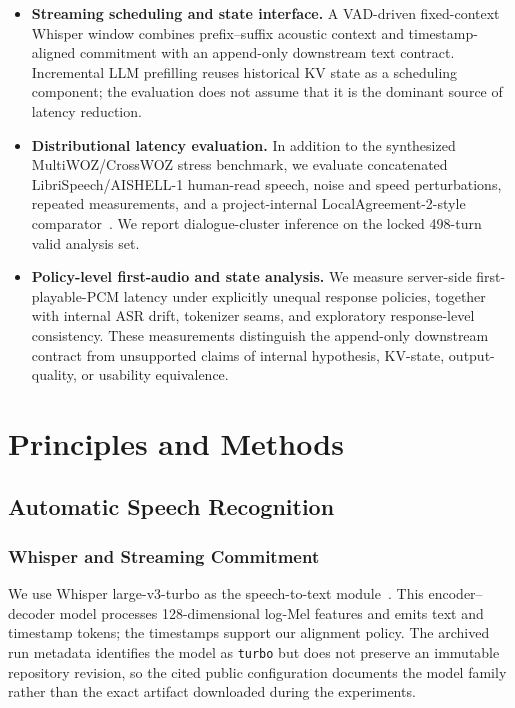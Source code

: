 \documentclass[conference]{IEEEtran}
\begin{document}
\begin{itemize}
\item \textbf{Streaming scheduling and state interface.} A VAD-driven fixed-context Whisper window combines prefix--suffix acoustic context and timestamp-aligned commitment with an append-only downstream text contract. Incremental LLM prefilling reuses historical KV state as a scheduling component; the evaluation does not assume that it is the dominant source of latency reduction.

\item \textbf{Distributional latency evaluation.} In addition to the synthesized MultiWOZ/CrossWOZ stress benchmark, we evaluate concatenated LibriSpeech/AISHELL-1 human-read speech, noise and speed perturbations, repeated measurements, and a project-internal LocalAgreement-2-style comparator~\cite{machacek2023turning,liu2020partialhypothesis}. We report dialogue-cluster inference on the locked 498-turn valid analysis set.

\item \textbf{Policy-level first-audio and state analysis.} We measure server-side first-playable-PCM latency under explicitly unequal response policies, together with internal ASR drift, tokenizer seams, and exploratory response-level consistency. These measurements distinguish the append-only downstream contract from unsupported claims of internal hypothesis, KV-state, output-quality, or usability equivalence.
\end{itemize}

\section{Principles and Methods}\label{sec:methods}

\subsection{Automatic Speech Recognition}

\subsubsection{Whisper and Streaming Commitment}

We use Whisper large-v3-turbo as the speech-to-text module~\cite{ref6,openai2024whisperlargev3turbo}. This encoder--decoder model processes 128-dimensional log-Mel features and emits text and timestamp tokens; the timestamps support our alignment policy. The archived run metadata identifies the model as \texttt{turbo} but does not preserve an immutable repository revision, so the cited public configuration documents the model family rather than the exact artifact downloaded during the experiments.
\end{document}
